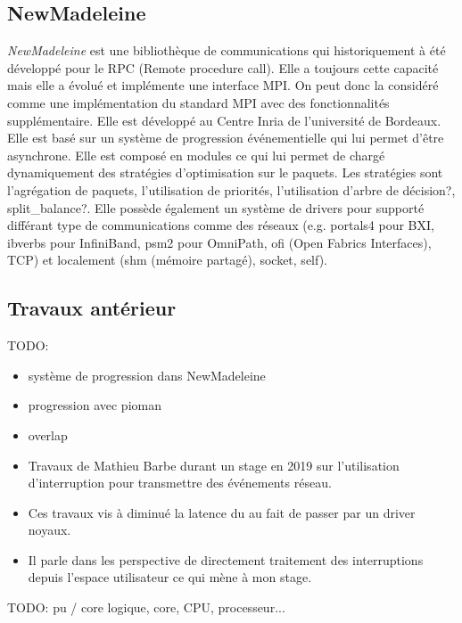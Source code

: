 \subsection{NewMadeleine}

\emph{NewMadeleine} est une bibliothèque de communications qui historiquement à été développé pour le RPC (Remote procedure call).
Elle a toujours cette capacité mais elle a évolué et implémente une interface MPI.
On peut donc la considéré comme une implémentation du standard MPI avec des fonctionnalités supplémentaire.
Elle est développé au Centre Inria de l'université de Bordeaux.
Elle est basé sur un système de progression événementielle qui lui permet d'être asynchrone.
Elle est composé en modules ce qui lui permet de chargé dynamiquement des stratégies d'optimisation sur le paquets.
Les stratégies sont l'agrégation de paquets, l'utilisation de priorités, l'utilisation d'arbre de décision?, split_balance?.
Elle possède également un système de drivers pour supporté différant type de communications comme des réseaux
(e.g. portals4 pour BXI, ibverbs pour InfiniBand, psm2 pour OmniPath, ofi (Open Fabrics Interfaces), TCP) %
et localement (shm (mémoire partagé), socket, self).

\subsection{Travaux antérieur}

TODO:

\begin{itemize}
  \item système de progression dans NewMadeleine
  \item progression avec pioman
  \item overlap
  \item Travaux de Mathieu Barbe durant un stage en 2019 sur l'utilisation d'interruption pour transmettre des événements réseau.
  \item Ces travaux vis à diminué la latence du au fait de passer par un driver noyaux.
  \item Il parle dans les perspective de directement traitement des interruptions depuis l'espace utilisateur ce qui mène à mon stage.
\end{itemize}



TODO: pu / core logique, core, CPU, processeur...
